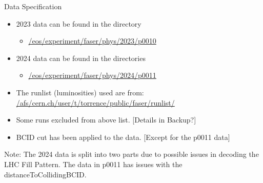 \begin{frame}{Data Specification}
    \begin{itemize}
        \item 2023 data can be found in the directory
        \begin{itemize}
            \item \href{/eos/experiment/faser/phys/2023/p0010}{/eos/experiment/faser/phys/2023/p0010}
        \end{itemize}
        \item 2024 data can be found in the directories
        \begin{itemize}
            \item \href{/eos/experiment/faser/phys/2024/p0011, p0012}{/eos/experiment/faser/phys/2024/p0011}
        \end{itemize}
        \item The runlist (luminosities) used are from:
        \href{/afs/cern.ch/user/t/torrence/public/faser/runlist/2024/faser runlist 2024 stable.csv}{/afs/cern.ch/user/t/torrence/public/faser/runlist/}
        \item Some runs excluded from above list. [Details in Backup?]
        \item BCID cut has been applied to the data. [Except for the p0011 data]
    \end{itemize}
    
    Note: The 2024 data is split into two parts due to possible issues in decoding the LHC Fill Pattern. The data in p0011 has issues with the distanceToCollidingBCID.
\end{frame}

